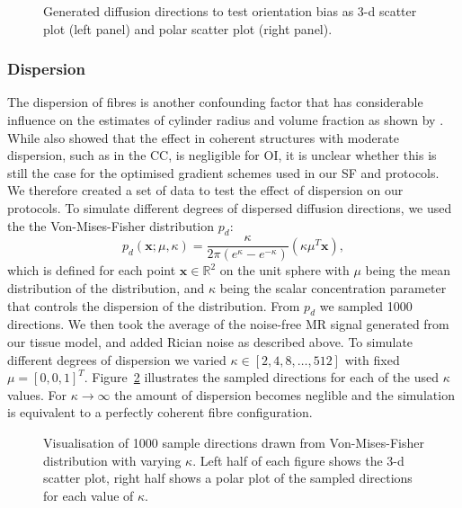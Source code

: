 \begin{figure}[h]
    \centering
	  \ifdraft
	  {
	  	\draftpic
	  }
	  {
	  	
	  }
	
        \caption{Generated diffusion directions to test orientation bias as 3-d scatter plot (left panel) and polar scatter plot (right panel).}
    \label{fig:chapter7 exp1 Ang Error dirs}
\end{figure}
\egroup

\subsubsection{Dispersion}
The dispersion of fibres is another confounding factor that has considerable influence on the estimates of cylinder radius and volume fraction as shown by \citet{Zhang:2011}. While \citeauthor{Zhang:2011} also showed that the effect in coherent structures with moderate dispersion, such as in the CC, is negligible for {\gls{OI}}, it is unclear whether this is still the case for the optimised gradient schemes used in our {\gls{SF}} and {\DO} protocols. We therefore created a set of data to test the effect of dispersion on our protocols. To simulate different degrees of dispersed diffusion directions, we used the the Von-Mises-Fisher distribution $p_{d}$:
\begin{equation}
	p_{d}(\mathbf{x}; \mu, \kappa)=\frac {\kappa} {2\pi(e^{\kappa}-e^{-\kappa})} \left( {\kappa \mu^T \mathbf{x} } \right),
\end{equation}
which is defined for each point $\mathbf{x} \in \mathbb{R}^2$ on the unit sphere with $\mu$ being the mean distribution of the distribution, and $\kappa$ being the scalar concentration parameter that controls the dispersion of the distribution. From $p_d$ we sampled 1000 directions. We then took the average of the noise-free MR signal generated from our tissue model, and added Rician noise as described above. To simulate different degrees of dispersion we varied $\kappa \in [2,4,8,\dots,512]$ with fixed $\mu=[0,0,1]^T$. Figure~\ref{fig:chapter7 exp1 VanMises draw} illustrates the sampled directions for each of the used $\kappa$ values. For $\kappa\rightarrow\infty$ the amount of dispersion becomes neglible and the simulation is equivalent to a perfectly coherent fibre configuration.

\bgroup
\tikzset{use png}
\begin{figure}[h]
    \centering 	
	 \caption{Visualisation of 1000 sample directions drawn from Von-Mises-Fisher distribution with varying $\kappa$. Left half of each figure shows the 3-d scatter plot, right half shows a polar plot of the sampled directions for each value of $\kappa$.}
  \label{fig:chapter7 exp1 VanMises draw}
 \end{figure}
\egroup
